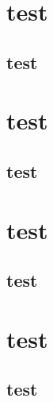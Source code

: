 \part{test}\bla\chapter{test}\bla
{}
\part{test}\bla\chapter{test}\bla
{}
\part{test}\bla\chapter{test}\bla
{}
\part{test}\bla\chapter{test}\bla


